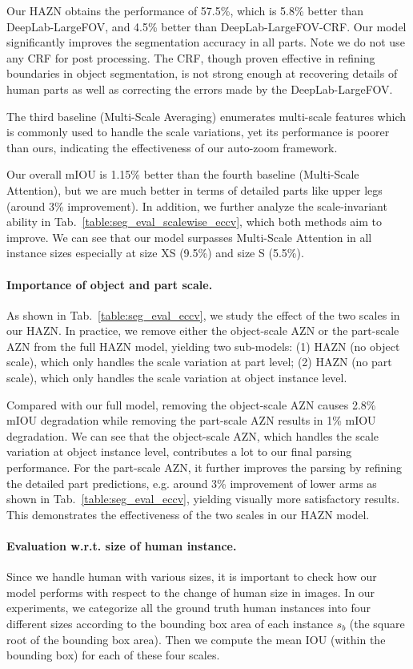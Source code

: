 Our HAZN obtains the performance of 57.5\%, which is 5.8\% better than DeepLab-LargeFOV, and 4.5\% better than DeepLab-LargeFOV-CRF. Our model significantly improves the segmentation accuracy in all parts. Note we do not use any CRF for post processing. The CRF, though proven effective in refining boundaries in object segmentation, is not strong enough at recovering details of human parts as well as correcting the errors made by the DeepLab-LargeFOV.

The third baseline (Multi-Scale Averaging) enumerates multi-scale features which is commonly used to handle the scale variations, yet its performance is poorer than ours, indicating the effectiveness of our auto-zoom framework.

Our overall mIOU is 1.15\% better than the fourth baseline (Multi-Scale Attention), but we are much better in terms of detailed parts like upper legs (around 3\% improvement). In addition, we further analyze the scale-invariant ability in Tab.~\ref{table:seg_eval_scalewise_eccv}, which both methods aim to improve.
We can see that our model surpasses Multi-Scale Attention in all instance sizes especially at size XS (9.5\%) and size S (5.5\%). 

\paragraph{\textbf{Importance of object and part scale.}}
As shown in Tab.~\ref{table:seg_eval_eccv}, we study the effect of the two scales in our HAZN.
In practice, we remove either the object-scale AZN or the part-scale AZN from the full HAZN model, yielding two sub-models: (1) HAZN (no object scale), which only handles the scale variation at part level; (2) HAZN (no part scale), which only handles the scale variation at object instance level. 

Compared with our full model, removing the object-scale AZN causes 2.8\% mIOU degradation while removing the part-scale AZN results in 1\% mIOU degradation. 
We can see that the object-scale AZN, which handles the scale variation at object instance level, contributes a lot to our final parsing performance.
For the part-scale AZN, it further improves the parsing by refining the detailed part predictions, e.g. around 3\% improvement of lower arms as shown in Tab.~\ref{table:seg_eval_eccv}, yielding visually more satisfactory results. This demonstrates the effectiveness of the two scales in our HAZN model.

\paragraph{\textbf{Evaluation w.r.t. size of human instance.}}
Since we handle human with various sizes, it is important to check how our model performs with respect to the change of human size in images. 
In our experiments, we categorize all the ground truth human instances into four different sizes according to the bounding box area of each instance $s_b$
(the square root of the bounding box area). Then we compute the mean IOU (within the bounding box) for each of these four scales.

